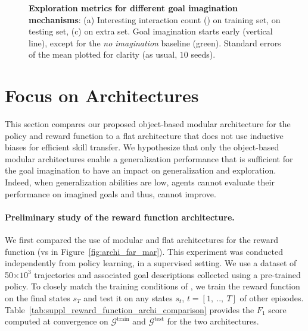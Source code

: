 \begin{figure*}[!h]
  \centering
  \caption{\textbf{Exploration metrics for different goal imagination mechanisms}: (a) Interesting interaction count (\itwoc) on training set, \itwoc on testing set, (c) \itwoc on extra set.  Goal imagination starts early (vertical line), except for the \textit{no imagination} baseline (green). Standard errors of the mean plotted for clarity (as usual, $10$ seeds).}
  \label{fig:suppl_explo_metrics_goalim}
\end{figure*}   

\clearpage

\section{Focus on Architectures}
\label{sec:suppl_archi}
This section compares our proposed object-based modular architecture \MA for the policy and reward function to a flat architecture that does not use inductive biases for efficient skill transfer. We hypothesize that only the object-based modular architectures enable a generalization performance that is sufficient for the goal imagination to have an impact on generalization and exploration. Indeed, when generalization abilities are low, agents cannot evaluate their performance on imagined goals and thus, cannot improve.

\paragraph{Preliminary study of the reward function architecture.} We first compared the use of modular and flat architectures for the reward function (\mar vs \far in Figure~\ref{fig:archi_far_mar}). This experiment was conducted independently from policy learning, in a supervised setting. We use a dataset of 50$\times{10^3}$ trajectories and associated goal descriptions collected using a pre-trained policy. To closely match the training conditions of \imagine, we train the reward function on the final states $s_{T}$ and test it on any states $s_t$, $t=[1,~..,~T]$ of other episodes. Table~\ref{tab:suppl_reward_function_archi_comparison} provides the $F_1$ score computed at convergence on $\mathcal{G}^\text{train}$ and $\mathcal{G}^\text{test}$ for the two architectures.

